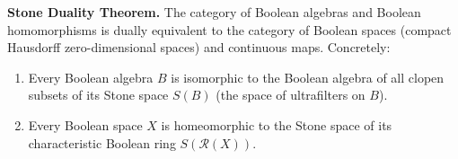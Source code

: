 \textbf{Stone Duality Theorem.} The category of Boolean algebras and Boolean homomorphisms is dually equivalent to the category of Boolean spaces (compact Hausdorff zero-dimensional spaces) and continuous maps. Concretely:
\begin{enumerate}
\item[(a)] Every Boolean algebra $B$ is isomorphic to the Boolean algebra of all clopen subsets of its Stone space $S(B)$ (the space of ultrafilters on $B$).
\item[(b)] Every Boolean space $X$ is homeomorphic to the Stone space of its characteristic Boolean ring $S(\mathcal{R}(X))$.
\end{enumerate}
